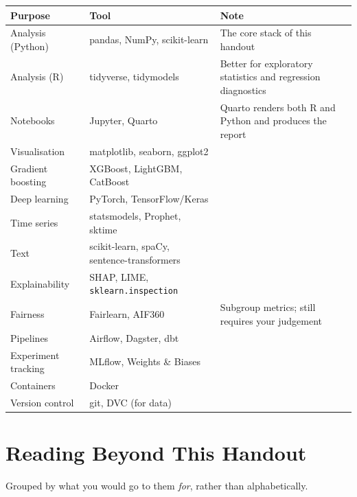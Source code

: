 \begin{longtable}{@{}L{3.4cm}L{4.2cm}L{6.4cm}@{}}
\toprule
{}
\textbf{Purpose} & \textbf{Tool} & \textbf{Note} \\
\midrule
\endhead
Analysis (Python) & pandas, NumPy, scikit-learn & The core stack of this handout \\
Analysis (R) & tidyverse, tidymodels & Better for exploratory statistics and regression diagnostics \\
Notebooks & Jupyter, Quarto & Quarto renders both R and Python and produces the report \\
Visualisation & matplotlib, seaborn, ggplot2 &  \\
Gradient boosting & XGBoost, LightGBM, CatBoost &  \\
Deep learning & PyTorch, TensorFlow/Keras &  \\
Time series & statsmodels, Prophet, sktime &  \\
Text & scikit-learn, spaCy, sentence-transformers &  \\
Explainability & SHAP, LIME, \texttt{sklearn.inspection} &  \\
Fairness & Fairlearn, AIF360 & Subgroup metrics; still requires your judgement \\
Pipelines & Airflow, Dagster, dbt &  \\
Experiment tracking & MLflow, Weights \& Biases &  \\
Containers & Docker &  \\
Version control & git, DVC (for data) &  \\
\bottomrule
\end{longtable}

\section{Reading Beyond This Handout}

Grouped by what you would go to them \emph{for}, rather than alphabetically.

